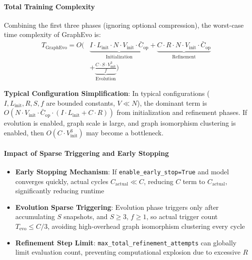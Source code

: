 \paragraph{Total Training Complexity}
Combining the first three phases (ignoring optional compression), the worst-case time complexity of GraphEvo is:
\begin{equation}
\begin{aligned}
    T_{\mathrm{GraphEvo}} = O(&\underbrace{I \cdot L_{\mathrm{init}} \cdot N \cdot V_{\mathrm{init}} \cdot \bar{C}_{\mathrm{op}}}_{\mathrm{Initialization}} + \underbrace{C \cdot R \cdot N \cdot V_{\mathrm{init}} \cdot \bar{C}_{\mathrm{op}}}_{\mathrm{Refinement}} \\
    &+ \underbrace{\frac{C \cdot S \cdot V_{\mathrm{init}}^3}{f}}_{\mathrm{Evolution}})
\end{aligned}
\end{equation}

\textbf{Typical Configuration Simplification}: In typical configurations ($I, L_{\mathrm{init}}, R, S, f$ are bounded constants, $V \ll N$), the dominant term is $O(N \cdot V_{\mathrm{init}} \cdot \bar{C}_{\mathrm{op}} \cdot (I \cdot L_{\mathrm{init}} + C \cdot R))$ from initialization and refinement phases. If evolution is enabled, graph scale is large, and graph isomorphism clustering is enabled, then $O(C \cdot V_{\mathrm{init}}^3)$ may become a bottleneck.

\paragraph{Impact of Sparse Triggering and Early Stopping}
\begin{itemize}
    \item \textbf{Early Stopping Mechanism}: If \texttt{enable\_early\_stop=True} and model converges quickly, actual cycles $C_{\mathrm{actual}} \ll C$, reducing $C$ term to $C_{\mathrm{actual}}$, significantly reducing runtime
    \item \textbf{Evolution Sparse Triggering}: Evolution phase triggers only after accumulating $S$ snapshots, and $S \geq 3$, $f \geq 1$, so actual trigger count $T_{\mathrm{evo}} \leq C/3$, avoiding high-overhead graph isomorphism clustering every cycle
    \item \textbf{Refinement Step Limit}: \texttt{max\_total\_refinement\_attempts} can globally limit evaluation count, preventing computational explosion due to excessive $R$
\end{itemize}


